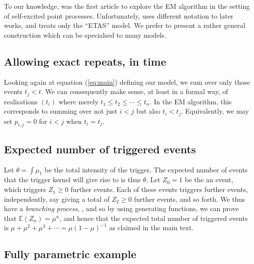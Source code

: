 \documentclass[twoside,a4paper]{article}
\theoremstyle{plain}
\theoremstyle{definition}
\begin{document}
To our knowledge, \cite{vs} was the first article to explore the EM algorithm in
the setting of self-excited point processes.  Unfortunately, \cite{vs} uses different
notation to later works, and treats only the ``ETAS'' model.  We prefer to present
a rather general construction which can be specialsed to many models.


\subsection{Allowing exact repeats, in time}\label{app:exact_repeats_in_time}

Looking again at equation (\ref{eq:main}) defining our model, we sum over only those
events $t_j<t$.  We can consequently make sense, at least in a formal way, of
realisations $(t_i)$ where merely $t_1 \leq t_2 \leq \cdots \leq t_n$.  In the EM
algorithm, this corresponds to summing over not just $i<j$ but also $t_i < t_j$.
Equivalently, we may set $p_{i,j}=0$ for $i<j$ when $t_i = t_j$.


\subsection{Expected number of triggered events}\label{app:gen_func}

Let $\theta = \int \mu_1$ be the total intensity of the trigger.  The expected number of
events that the trigger kernel will give rise to is thus $\theta$.
Let $Z_0=1$ be the an event, which triggers $Z_1 \geq 0$ further events.  Each of
these events triggers further events, independently, say giving a total of $Z_2\geq 0$
further events, and so forth.  We thus have a \emph{branching process}, \cite[Section~5.4]{gs},
and so by using generating functions, we can prove that $\mathbb E(Z_n) = \mu^n$, and hence
that the expected total number of triggered events is $\mu + \mu^2 + \mu^3 + \cdots
= \mu(1-\mu)^{-1}$ as claimed in the main text.



\subsection{Fully parametric example}\label{app:hawkes_em}
\end{document}
